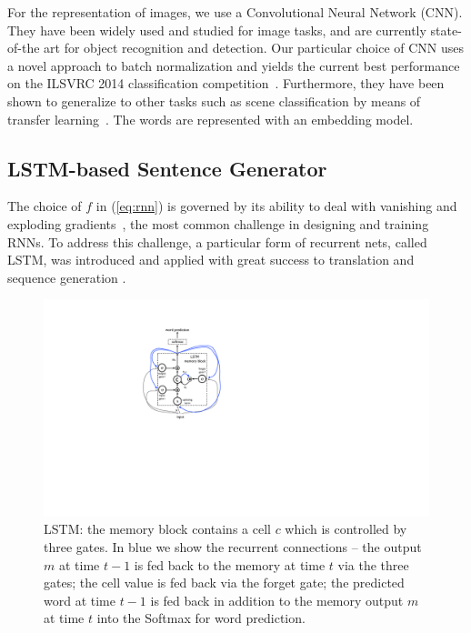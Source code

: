 For the representation of images, we use a Convolutional Neural Network
(CNN). They have been widely used and studied for image tasks, and are
currently state-of-the art for object recognition and detection. Our particular
choice of CNN uses a novel approach to batch normalization and yields the
current best performance on the ILSVRC 2014 classification
competition~\cite{batchnorm}. Furthermore, they have been shown to
generalize to other tasks such as scene classification by means of
transfer learning~\cite{decaf2014}. The words are represented with an embedding
model.

\subsection{LSTM-based Sentence Generator}
\label{sec:lstm}

The choice of $f$ in (\ref{eq:rnn}) is governed by its 
ability to deal with vanishing and exploding gradients~\cite{hochreiter1997long},
the most common
challenge in designing and training RNNs. To address this challenge, a  particular form 
of recurrent nets, called LSTM, was introduced \cite{hochreiter1997long}
and applied with great success to translation \cite{cho2014learning,sutskever2014sequence} and sequence generation \cite{graves2013generating}.

\begin{figure}
\begin{center}
\includegraphics[width=0.85\columnwidth]{detailed_lstm_figure.pdf}
\end{center}
\caption{\label{fig:lstm} LSTM: the memory block contains a cell $c$ which is controlled by three gates. In blue we show the recurrent connections -- the output $m$ at time $t-1$ is fed back to the memory at time $t$ via the three gates; the cell value is fed back via the forget gate; the predicted word at time $t-1$ is fed back in addition to the memory output $m$ at time $t$ into the Softmax for word prediction.}
\end{figure}

